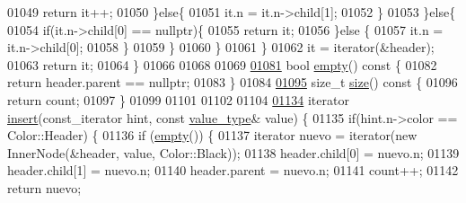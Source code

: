 \begin{DoxyCode}
01049                         \textcolor{keywordflow}{return} it++;
01050                     \}\textcolor{keywordflow}{else}\{
01051                         it.n = it.n->child[1];
01052                     \}
01053                 \}\textcolor{keywordflow}{else}\{
01054                     \textcolor{keywordflow}{if}(it.n->child[0] == \textcolor{keyword}{nullptr})\{
01055                         \textcolor{keywordflow}{return} it;
01056                     \}\textcolor{keywordflow}{else} \{
01057                         it.n = it.n->child[0];
01058                     \}
01059                 \}
01060             \}
01061         \}
01062         it = iterator(&header);
01063         \textcolor{keywordflow}{return} it;
01064     \}
01066 
01068 
01069 
\hypertarget{map0_8h_source.tex_l01081}{}\hyperlink{classaed2_1_1map_af5320ca0a7df4d16015441d5d055a7ee_af5320ca0a7df4d16015441d5d055a7ee}{01081}     \textcolor{keywordtype}{bool} \hyperlink{classaed2_1_1map_af5320ca0a7df4d16015441d5d055a7ee_af5320ca0a7df4d16015441d5d055a7ee}{empty}()\textcolor{keyword}{ const }\{
01082         \textcolor{keywordflow}{return} header.parent == \textcolor{keyword}{nullptr};
01083     \}
01084 
\hypertarget{map0_8h_source.tex_l01095}{}\hyperlink{classaed2_1_1map_a89f2613f926ac13293eafe65889d6021_a89f2613f926ac13293eafe65889d6021}{01095}     \textcolor{keywordtype}{size\_t} \hyperlink{classaed2_1_1map_a89f2613f926ac13293eafe65889d6021_a89f2613f926ac13293eafe65889d6021}{size}()\textcolor{keyword}{ const }\{
01096         \textcolor{keywordflow}{return} count;
01097     \}
01099 
01101 
01102 
01104 
\hypertarget{map0_8h_source.tex_l01134}{}\hyperlink{classaed2_1_1map_a6941cde9a79c27f054b5c97a587a1854_a6941cde9a79c27f054b5c97a587a1854}{01134}     iterator \hyperlink{classaed2_1_1map_a6941cde9a79c27f054b5c97a587a1854_a6941cde9a79c27f054b5c97a587a1854}{insert}(const\_iterator hint, \textcolor{keyword}{const} \hyperlink{classaed2_1_1map_a719db98e0ff9a837610f76be33264680_a719db98e0ff9a837610f76be33264680}{value\_type}& value) \{
01135         \textcolor{keywordflow}{if}(hint.n->color == Color::Header) \{
01136             \textcolor{keywordflow}{if} (\hyperlink{classaed2_1_1map_af5320ca0a7df4d16015441d5d055a7ee_af5320ca0a7df4d16015441d5d055a7ee}{empty}()) \{
01137                 iterator nuevo = iterator(\textcolor{keyword}{new} InnerNode(&header, value, Color::Black));
01138                 header.child[0] = nuevo.n;
01139                 header.child[1] = nuevo.n;
01140                 header.parent = nuevo.n;
01141                 count++;
01142                 \textcolor{keywordflow}{return} nuevo;

\end{DoxyCode}
